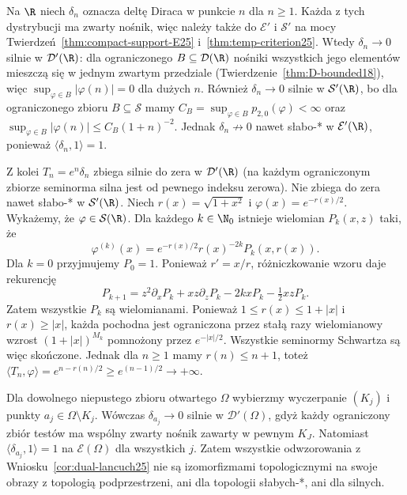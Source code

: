 \begin{przyklad}
\label{ex:escaping-deltas25}
Na $\R$ niech $\delta_n$ oznacza deltę Diraca w punkcie
$n$ dla $n\ge1$. Każda z tych dystrybucji ma zwarty
nośnik, więc należy także do $\mathcal E'$ i $\mathcal S'$
na mocy Twierdzeń~\ref{thm:compact-support-E25}
i~\ref{thm:temp-criterion25}.
Wtedy $\delta_n\to0$ silnie w $\mathcal D'(\R)$:
dla ograniczonego $B\subseteq\mathcal D(\R)$ nośniki
wszystkich jego elementów mieszczą się w jednym zwartym
przedziale (Twierdzenie~\ref{thm:D-bounded18}), więc
$\sup_{\varphi\in B}|\varphi(n)|=0$ dla dużych $n$.
Również $\delta_n\to0$ silnie w $\mathcal S'(\R)$, bo dla
ograniczonego zbioru $B\subseteq\mathcal S$ mamy
$C_B=\sup_{\varphi\in B}p_{2,0}(\varphi)<\infty$ oraz
$\sup_{\varphi\in B}|\varphi(n)|\le C_B(1+n)^{-2}$.
Jednak $\delta_n\not\to0$ nawet słabo-* w
$\mathcal E'(\R)$, ponieważ $\langle\delta_n,1\rangle=1$.

Z kolei $T_n=e^n\delta_n$ zbiega silnie do zera w
$\mathcal D'(\R)$ (na każdym ograniczonym zbiorze
seminorma silna jest od pewnego indeksu zerowa).
Nie zbiega do zera nawet słabo-* w $\mathcal S'(\R)$.
Niech $r(x)=\sqrt{1+x^2}$ i $\varphi(x)=e^{-r(x)/2}$.
Wykażemy, że $\varphi\in\mathcal S(\R)$.
Dla każdego $k\in\N_0$ istnieje wielomian $P_k(x,z)$
taki, że
\[
 \varphi^{(k)}(x)=e^{-r(x)/2}r(x)^{-2k}P_k(x,r(x)).
\]
Dla $k=0$ przyjmujemy $P_0=1$. Ponieważ $r'=x/r$,
różniczkowanie wzoru daje rekurencję
\[
 P_{k+1}=z^2\partial_x P_k+xz\partial_z P_k
          -2kxP_k-\tfrac12 xzP_k.
\]
Zatem wszystkie $P_k$ są wielomianami. Ponieważ
$1\le r(x)\le1+|x|$ i $r(x)\ge|x|$, każda pochodna
jest ograniczona przez stałą razy wielomianowy wzrost
$(1+|x|)^{M_k}$ pomnożony przez $e^{-|x|/2}$.
Wszystkie seminormy Schwartza są więc skończone.
Jednak dla $n\ge1$ mamy $r(n)\le n+1$, toteż
$\langle T_n,\varphi\rangle=e^{n-r(n)/2}
\ge e^{(n-1)/2}\to+\infty$.

Dla dowolnego niepustego zbioru otwartego $\Omega$
wybierzmy wyczerpanie $(K_j)$ i punkty
$a_j\in\Omega\setminus K_j$.
Wówczas $\delta_{a_j}\to0$ silnie w $\mathcal D'(\Omega)$,
gdyż każdy ograniczony zbiór testów ma wspólny zwarty
nośnik zawarty w pewnym $K_J$.
Natomiast $\langle\delta_{a_j},1\rangle=1$ na
$\mathcal E(\Omega)$ dla wszystkich $j$.
Zatem wszystkie odwzorowania z
Wniosku~\ref{cor:dual-lancuch25} nie są izomorfizmami
topologicznymi na swoje obrazy z topologią podprzestrzeni,
ani dla topologii słabych-*, ani dla silnych.
\end{przyklad}


